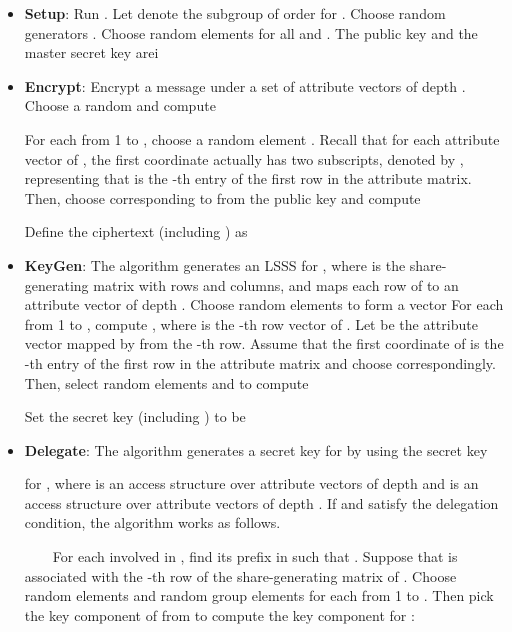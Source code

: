 \documentclass[twocolumn]{svjour3}          \smartqed  \usepackage{graphicx}
\begin{document}
\begin{itemize}
  \item  \textbf{ Setup}: Run . Let
       denote the subgroup of order  for . Choose random generators . Choose
      random elements  for all  and .
      The public key and the master secret key arei
             
      

      \medskip
  \item  \textbf{Encrypt}: Encrypt a message  under a set  of attribute vectors of depth . Choose a random  and compute
       
       For each  from 1 to , choose a random element . Recall that for each attribute vector  of , the first coordinate  actually has two subscripts, denoted by , representing that  is the -th entry of the first row in the attribute matrix. Then, choose  corresponding to  from the public key and compute
       

      Define the ciphertext (including ) as
       

       \medskip
  \item  \textbf{KeyGen}: The algorithm generates an LSSS  for , where
       is the share-generating matrix with  rows and  columns, and  maps each row of  to an attribute vector of
      depth . Choose  random elements  to form a vector 
      For each  from 1 to , compute , where  is the -th row vector of . Let  be the attribute vector mapped by  from the -th row. Assume that the first coordinate  of  is the -th entry of the first row in the attribute matrix and choose  correspondingly. Then, select random elements  and  to compute
      
      
      
      Set the secret key (including
      ) to be
      

      \medskip
  \item \noindent \textbf{Delegate}: The algorithm generates a secret key  for  by using
      the secret key
      
      for , where  is an access structure over  attribute vectors of depth  and  is an access structure
      over  attribute vectors of depth . If  and  satisfy the delegation condition, the algorithm works as follows.

      ~~~~For each  involved in , find its prefix  in  such that
      . Suppose that  is associated with the -th row of the share-generating matrix of . Choose
      random elements  and random group elements  for each  from 1 to . Then pick the key 
component   of 
      from  to compute the key component for :



\end{itemize}
\end{document}
